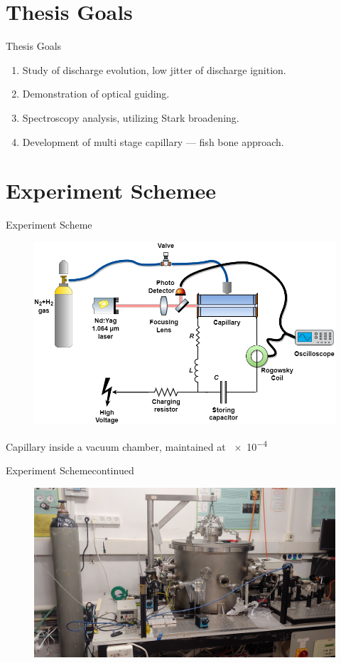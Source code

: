 \documentclass[dvipsnames]{beamer}
\begin{document}
\section{Thesis Goals}
\begin{frame}{Thesis Goals}
 \begin{enumerate}
   \item Study of discharge evolution, low jitter of discharge ignition.
   \item Demonstration of optical guiding.
   \item Spectroscopy analysis, utilizing Stark broadening.
   \item Development of multi stage capillary --- fish bone approach.
 \end{enumerate}
\end{frame}
\section{Experiment Schemee}
\begin{frame}{Experiment Scheme}
\begin{figure}
    \includegraphics[width=\textwidth]{figures/methods/Laser-based ignition scheme.png}
\end{figure}
Capillary inside a vacuum chamber, maintained at \SI{e-4}{\torr}
\end{frame}
\begin{frame}{Experiment Scheme}{continued}
\begin{figure}
    \includegraphics[width=\textwidth]{figures/methods/system_picture.jpg}
\end{figure}
\end{frame}
\end{document}
